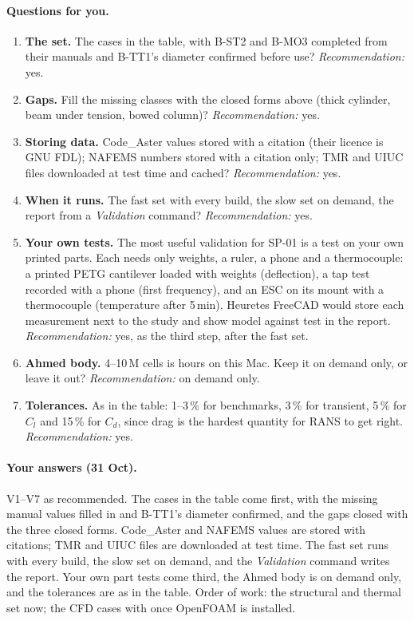 \paragraph{Questions for you.}
\begin{enumerate}[label=V\arabic*.]
  \item \textbf{The set.} The cases in the table, with B-ST2 and B-MO3 completed from their manuals and B-TT1's
        diameter confirmed before use? \emph{Recommendation:} yes.
  \item \textbf{Gaps.} Fill the missing classes with the closed forms above (thick cylinder, beam under tension,
        bowed column)? \emph{Recommendation:} yes.
  \item \textbf{Storing data.} Code\_Aster values stored with a citation (their licence is GNU FDL); NAFEMS
        numbers stored with a citation only; TMR and UIUC files downloaded at test time and cached?
        \emph{Recommendation:} yes.
  \item \textbf{When it runs.} The fast set with every build, the slow set on demand, the report from a
        \emph{Validation} command? \emph{Recommendation:} yes.
  \item \textbf{Your own tests.} The most useful validation for SP-01 is a test on your own printed parts. Each
        needs only weights, a ruler, a phone and a thermocouple: a printed PETG cantilever loaded with weights
        (deflection), a tap test recorded with a phone (first frequency), and an ESC on its mount with a
        thermocouple (temperature after 5\,min). Heuretes FreeCAD would store each measurement next to the study and
        show model against test in the report. \emph{Recommendation:} yes, as the third step, after the fast
        set.
  \item \textbf{Ahmed body.} 4--10\,M cells is hours on this Mac. Keep it on demand only, or leave it out?
        \emph{Recommendation:} on demand only.
  \item \textbf{Tolerances.} As in the table: 1--3\,\% for benchmarks, 3\,\% for transient, 5\,\% for $C_l$
        and 15\,\% for $C_d$, since drag is the hardest quantity for RANS to get right.
        \emph{Recommendation:} yes.
\end{enumerate}

\paragraph{Your answers (31 Oct).} V1--V7 as recommended. The cases in the table come first, with the missing
manual values filled in and B-TT1's diameter confirmed, and the gaps closed with the three closed forms.
Code\_Aster and NAFEMS values are stored with citations; TMR and UIUC files are downloaded at test time. The
fast set runs with every build, the slow set on demand, and the \emph{Validation} command writes the report.
Your own part tests come third, the Ahmed body is on demand only, and the tolerances are as in the table. Order
of work: the structural and thermal set now; the CFD cases with  once OpenFOAM is installed.
